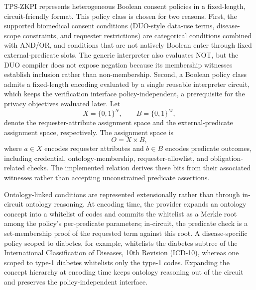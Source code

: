 TPS-ZKPI represents heterogeneous Boolean consent policies in a fixed-length, circuit-friendly format.
This policy class is chosen for two reasons.
First, the supported biomedical consent conditions (DUO-style data-use terms, disease-scope constraints, and requester restrictions) are categorical conditions combined with AND/OR, and conditions that are not natively Boolean enter through fixed external-predicate slots.
The generic interpreter also evaluates NOT, but the DUO compiler does not expose negation because its membership witnesses establish inclusion rather than non-membership.
Second, a Boolean policy class admits a fixed-length encoding evaluated by a single reusable interpreter circuit, which keeps the verification interface policy-independent, a prerequisite for the privacy objectives evaluated later.
Let
\begin{equation}
	X = \{0,1\}^{N}, \qquad B = \{0,1\}^{M},
\end{equation}
denote the requester-attribute assignment space and the external-predicate assignment space, respectively.
The assignment space is
\begin{equation}
	O = X \times B,
\end{equation}
where $a \in X$ encodes requester attributes and $b \in B$ encodes predicate outcomes, including credential, ontology-membership, requester-allowlist, and obligation-related checks.
The implemented relation derives these bits from their associated witnesses rather than accepting unconstrained predicate assertions.

Ontology-linked conditions are represented extensionally rather than through in-circuit ontology reasoning.
At encoding time, the provider expands an ontology concept into a whitelist of codes and commits the whitelist as a Merkle root among the policy's per-predicate parameters; in-circuit, the predicate check is a set-membership proof of the requested term against this root.
A disease-specific policy scoped to diabetes, for example, whitelists the diabetes subtree of the International Classification of Diseases, 10th Revision (ICD-10), whereas one scoped to type-1 diabetes whitelists only the type-1 codes.
Expanding the concept hierarchy at encoding time keeps ontology reasoning out of the circuit and preserves the policy-independent interface.

